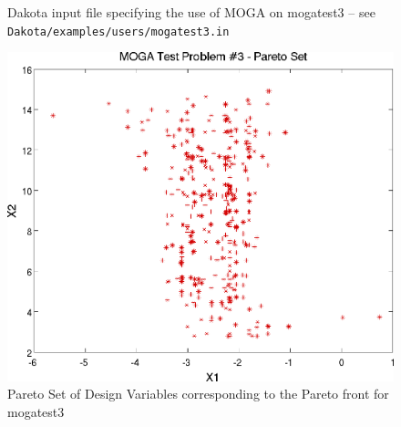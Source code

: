 \begin{figure}
  \centering
  \begin{bigbox}
    \begin{small}
    \end{small}
  \end{bigbox}
  \caption{Dakota input file specifying the use of MOGA on mogatest3 --
see \texttt{Dakota/examples/users/mogatest3.in} }
  \label{additional:moga3inp}
\end{figure}

\begin{figure}
  \centering
  \includegraphics[scale=0.75]{images/dakota_mogatest3_pareto_set}
  \caption{Pareto Set of Design Variables corresponding to the Pareto
    front for mogatest3}
  \label{additional:moga3set}
\end{figure}

